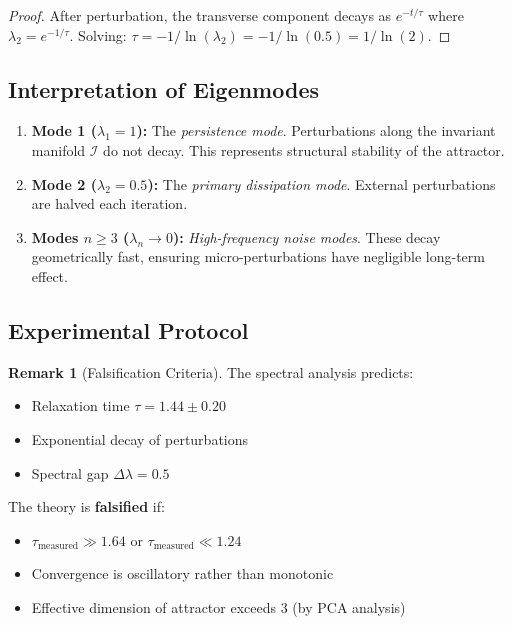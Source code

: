 \documentclass[11pt,a4paper]{article}
\theoremstyle{plain}
\theoremstyle{definition}
\newtheorem{remark}[theorem]{Remark}
\newcommand{\I}{\mathcal{I}}
\begin{document}
\begin{proof}
After perturbation, the transverse component decays as $e^{-t/\tau}$ where $\lambda_2 = e^{-1/\tau}$. Solving: $\tau = -1/\ln(\lambda_2) = -1/\ln(0.5) = 1/\ln(2)$.
\end{proof}

\subsection{Interpretation of Eigenmodes}

\begin{enumerate}
    \item \textbf{Mode 1 ($\lambda_1 = 1$):} The \textit{persistence mode}. Perturbations along the invariant manifold $\I$ do not decay. This represents structural stability of the attractor.
    
    \item \textbf{Mode 2 ($\lambda_2 = 0.5$):} The \textit{primary dissipation mode}. External perturbations are halved each iteration.
    
    \item \textbf{Modes $n \geq 3$ ($\lambda_n \to 0$):} \textit{High-frequency noise modes}. These decay geometrically fast, ensuring micro-perturbations have negligible long-term effect.
\end{enumerate}

\subsection{Experimental Protocol}

\begin{remark}[Falsification Criteria]
The spectral analysis predicts:
\begin{itemize}
    \item Relaxation time $\tau = 1.44 \pm 0.20$
    \item Exponential decay of perturbations
    \item Spectral gap $\Delta\lambda = 0.5$
\end{itemize}

The theory is \textbf{falsified} if:
\begin{itemize}
    \item $\tau_{\text{measured}} \gg 1.64$ or $\tau_{\text{measured}} \ll 1.24$
    \item Convergence is oscillatory rather than monotonic
    \item Effective dimension of attractor exceeds 3 (by PCA analysis)
\end{itemize}
\end{remark}
\end{document}
